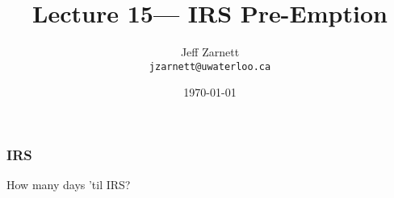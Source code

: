 

\title{Lecture 15--- IRS Pre-Emption }

\author{Jeff Zarnett \\ \small \texttt{jzarnett@uwaterloo.ca}}
\date{\today}




\begin{frame}
  \titlepage

 \end{frame}

\begin{frame}
\frametitle{IRS}

How many days 'til IRS?

\end{frame}



